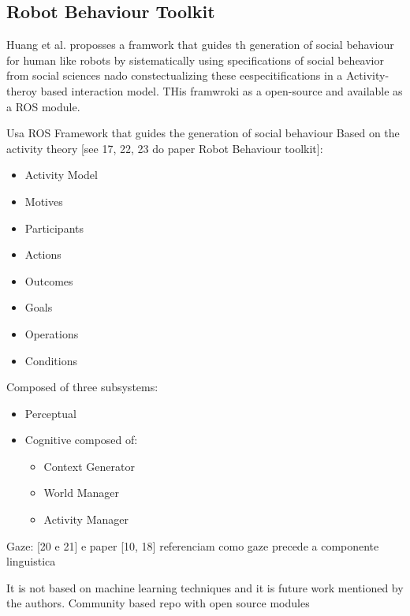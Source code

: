 \subsection{Robot Behaviour Toolkit}
\label{subsec:RobotBehaviourToolkit}

Huang et al. proposses a framwork that guides th generation of social behaviour for human like robots by sistematically using specifications of social beheavior from social sciences nado constectualizing these eespecitifications in a Activity-theroy based interaction model. THis framwroki as a open-source and available as a ROS module.







Usa ROS
Framework that guides the generation of social behaviour
Based on the activity theory [see 17, 22, 23 do paper Robot Behaviour toolkit]:
\begin{itemize}
	\item Activity Model
	\item Motives
	\item Participants
	\item Actions
	\item Outcomes
	\item Goals
	\item Operations
	\item Conditions
\end{itemize}

Composed of three subsystems:
\begin{itemize}
	\item Perceptual
	\item Cognitive composed of:
		\begin{itemize}
			\item Context Generator
			\item World Manager
			\item Activity Manager
		\end{itemize}
\end{itemize}

Gaze: [20 e 21] e paper [10, 18] referenciam como gaze precede a componente linguistica

It is not based on machine learning techniques and it is future work mentioned by the authors.
Community based repo with open source modules